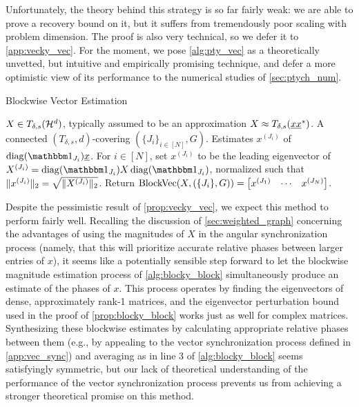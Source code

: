 Unfortunately, the theory behind this strategy is so far fairly weak: we are able to prove a recovery bound on it, but it suffers from tremendously poor scaling with problem dimension.  The proof is also very technical, so we defer it to \cref{app:vecky_vec}.  For the moment, we pose \cref{alg:pty_vec} as a theoretically unvetted, but intuitive and empirically promising technique, and defer a more optimistic view of its performance to the numerical studies of \cref{sec:ptych_num}.

\begin{algorithm}[htbp]
\renewcommand{\algorithmicrequire}{\textbf{Input:}}
\renewcommand{\algorithmicensure}{\textbf{Output:}}
\caption{Blockwise Vector Estimation}
\label{alg:vecky_vec}
\begin{algorithmic}[1]
    \REQUIRE $X \in T_{\delta, s}(\mathcal{H}^d)$, typically assumed to be an approximation $X \approx T_{\delta, s}(\underline{x} \underline{x}^*)$.  A connected $(T_{\delta, s}, d)$-covering $(\{J_i\}_{i \in [N]}, G)$.
    \ENSURE Estimates $x^{(J_i)}$ of $\diag(\one_{J_i}) \ux$.
    \STATE For $i \in [N]$, set $x^{(J_i)}$ to be the leading eigenvector of $X^{(J_i)} = \diag(\one_{J_i}) X \diag(\one_{J_i})$, normalized such that $\lVert x^{(J_i)}\rVert_2 = \sqrt{\lVert X^{(J_i)}\rVert_2}$.
    \STATE Return $\operatorname{BlockVec}(X, (\{J_i\}, G)) = \begin{bmatrix} x^{(J_1)} & \cdots & x^{(J_N)} \end{bmatrix}$.
\end{algorithmic}
\end{algorithm}

Despite the pessimistic result of \cref{prop:vecky_vec}, we expect this method to perform fairly well.  Recalling the discussion of \cref{sec:weighted_graph} concerning the advantages of using the magnitudes of $X$ in the angular synchronization process (namely, that this will prioritize accurate relative phases between larger entries of $x$), it seems like a potentially sensible step forward to let the blockwise magnitude estimation process of \cref{alg:blocky_block} simultaneously produce an estimate of the phases of $x$.  This process operates by finding the eigenvectors of dense, approximately rank-1 matrices, and the eigenvector perturbation bound used in the proof of \cref{prop:blocky_block} works just as well for complex matrices.  Synthesizing these blockwise estimates by calculating appropriate relative phases between them (e.g., by appealing to the vector synchronization process defined in \cref{app:vec_sync}) and averaging as in line 3 of \cref{alg:blocky_block} seems satisfyingly symmetric, but our lack of theoretical understanding of the performance of the vector synchronization process prevents us from achieving a stronger theoretical promise on this method.

